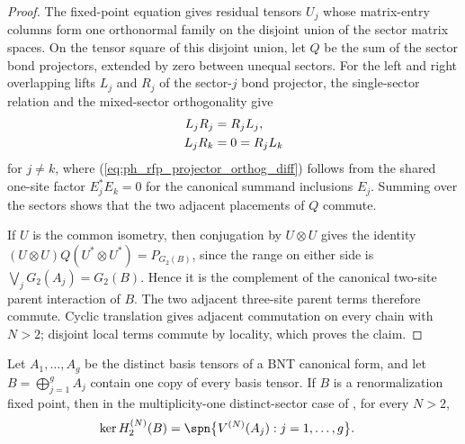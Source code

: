 \begin{proof}\leanok
    The fixed-point equation gives residual tensors $U_j$ whose matrix-entry
    columns form one orthonormal family on the disjoint union of the sector
    matrix spaces. On the tensor square of this disjoint union, let $Q$ be the
    sum of the sector bond projectors, extended by zero between unequal
    sectors. For the left and right overlapping lifts $L_j$ and $R_j$
    of the sector-$j$ bond projector, the single-sector relation and the
    mixed-sector orthogonality give
    \begin{align}
        L_jR_j & =R_jL_j, \notag \\
        L_jR_k & =0=R_jL_k
        \label{eq:ph_rfp_projector_orthog_diff}
    \end{align}
    for $j\ne k$, where (\ref{eq:ph_rfp_projector_orthog_diff}) follows from the shared one-site factor
    $E_j^*E_k=0$ for the canonical summand inclusions $E_j$. Summing over the
    sectors shows that the two adjacent placements of $Q$ commute.

    If $U$ is the common isometry, then conjugation by $U\otimes U$ gives the identity
    $(U\otimes U)Q(U^*\otimes U^*) =P_{G_2(B)}$,
    since the range on either side is
    $\bigvee_j G_2(A_j)=G_2(B)$. Hence it is the complement of the canonical
    two-site parent interaction of $B$. The two adjacent three-site parent
    terms therefore commute. Cyclic translation gives adjacent commutation on
    every chain with $N>2$; disjoint local terms commute by locality, which
    proves the claim.
\end{proof}

\begin{lemma}%
    \label{thm:rfp_multiplicity_one_bnt_parent_ground_spaces}
    \leanok
    Let $A_1,\ldots,A_g$ be the distinct basis tensors of a BNT canonical
    form, and let $B=\bigoplus_{j=1}^g A_j$ contain one copy of every basis
    tensor. If $B$ is a renormalization fixed point, then in the
    multiplicity-one distinct-sector case of
    \cite[Theorem~3.10]{Cirac2016MPDO_arXiv}, for every $N>2$,
    \begin{align}
        \ker H_2^{(N)}(B)
         & =\spn\bigl\{V^{(N)}(A_j):j=1,\ldots,g\bigr\}. \notag
    \end{align}
\end{lemma}

